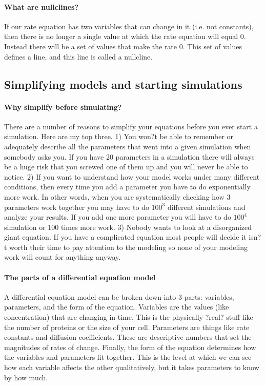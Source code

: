 \paragraph{What are nullclines?} If our rate equation has two variables that can change in it (i.e. not constants), then there is no longer a single value at which the rate equation will equal 0.  Instead there will be a set of values that make the rate 0.  This set of values defines a line, and this line is called a nullcline. 
% 



\subsection{Simplifying models and starting simulations}
\paragraph{Why simplify before simulating?} There are a number of reasons to simplify your equations before you ever start a simulation.  Here are my top three.  
1) You won?t be able to remember or adequately describe all the parameters that went into a given simulation when somebody asks you.  If you have 20 parameters in a simulation there will always be a huge risk that you screwed one of them up and you will never be able to notice.  
2) If you want to understand how your model works under many different conditions, then every time you add a parameter you have to do exponentially more work.  In other words, when you are systematically checking how 3 parameters work together you may have to do $100^3$ different simulations and analyze your results.  If you add one more parameter you will have to do $100^4$ simulation or 100 times more work.  
3) Nobody wants to look at a disorganized giant equation.  If you have a complicated equation most people will decide it isn?t worth their time to pay attention to the modeling so none of your modeling work will count for anything anyway.

\paragraph{The parts of a differential equation model} A differential equation model can be broken down into 3 parts: variables, parameters, and the form of the equation.  Variables are the values (like concentration) that are changing in time.  This is the physically ?real? stuff like the number of proteins or the size of your cell.  Parameters are things like rate constants and diffusion coefficients.  These are descriptive numbers that set the magnitudes of rates of change.  Finally, the form of the equation determines how the variables and parameters fit together.  This is the level at which we can see how each variable affects the other qualitatively, but it takes parameters to know by how much.

